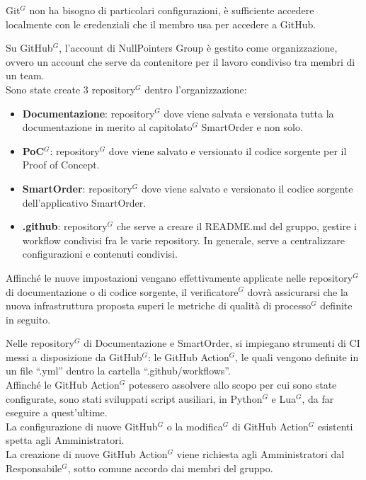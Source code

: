 Git$^G$ non ha bisogno di particolari configurazioni, è sufficiente accedere localmente con le credenziali che il membro usa per accedere a GitHub.

Su GitHub$^G$, l’account di NullPointers Group è gestito come organizzazione, ovvero un account che serve da contenitore per il lavoro condiviso tra membri di un team.\\
Sono state create 3 repository$^G$ dentro l’organizzazione:
\begin{itemize}[itemsep=3pt, parsep=1pt, label=$\scriptstyle\bullet$]
    \item \textbf{Documentazione}: repository$^G$ dove viene salvata e versionata tutta la documentazione in merito al capitolato$^G$ SmartOrder e non solo.
    \item \textbf{PoC$^G$}: repository$^G$ dove viene salvato e versionato il codice sorgente per il Proof of Concept.
    \item \textbf{SmartOrder}: repository$^G$ dove viene salvato e versionato il codice sorgente dell’applicativo SmartOrder.
    \item \textbf{.github}: repository$^G$ che serve a creare il README.md del gruppo, gestire i workflow condivisi fra le varie repository. In generale, serve a centralizzare configurazioni e contenuti condivisi.
\end{itemize}
Affinché le nuove impostazioni vengano effettivamente applicate nelle repository$^G$ di documentazione o di codice sorgente, il verificatore$^G$ dovrà assicurarsi che la nuova infrastruttura proposta superi le metriche di qualità di processo$^G$ definite in seguito.

Nelle repository$^G$ di Documentazione e SmartOrder, si impiegano strumenti di CI messi a disposizione da GitHub$^G$: le GitHub Action$^G$, le quali vengono definite in un file “.yml” dentro la cartella “.github/workflows”.\\
Affinché le GitHub Action$^G$ potessero assolvere allo scopo per cui sono state configurate, sono stati sviluppati script ausiliari, in Python$^G$ e Lua$^G$, da far eseguire a quest'ultime.\\
La configurazione di nuove GitHub$^G$ o la modifica$^G$ di GitHub Action$^G$ esistenti spetta agli Amministratori.\\
La creazione di nuove GitHub Action$^G$ viene richiesta agli Amministratori dal Responsabile$^G$, sotto comune accordo dai membri del gruppo.\\

